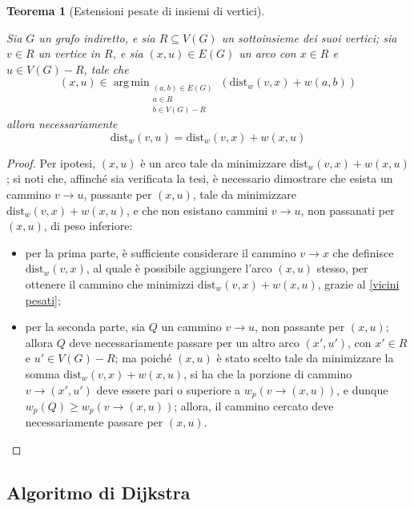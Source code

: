 \documentclass[14pt]{extreport}
\DeclareMathOperator*{\argmin}{arg\,min}
\newtheorem{theorem}{Teorema}[subsection]
\theoremstyle{definition}
\theoremstyle{definition}
\begin{document}
\begin{theorem}[Estensioni pesate di insiemi di vertici]
    \label{dijkstra theorem}

    Sia $G$ un grafo indiretto, e sia $R \subseteq V(G)$ un sottoinsieme dei suoi vertici; sia $v\in R$ un vertice in $R$, e sia $(x, u) \in E(G)$ un arco con $x \in R$ e $u \in V(G) - R$, tale che $$(x, u) \in \argmin_{\substack{(a, b) \in E(G) \\ a \in R \\ b \in V(G) - R}}{\left(\mathrm{dist}_w(v, x) + w(a, b)\right)}$$ allora necessariamente $$\mathrm{dist}_w(v, u) = \mathrm{dist}_w(v, x) + w(x, u)$$
\end{theorem}

\begin{proof}
    Per ipotesi, $(x, u)$ è un arco tale da minimizzare $\mathrm{dist}_w(v, x) + w(x, u)$; si noti che, affinché sia verificata la tesi, è necessario dimostrare che esista un cammino $v \rightarrow u$, passante per $(x, u)$, tale da minimizzare $\mathrm{dist}_w(v, x) + w(x, u)$, e che non esistano cammini $v \rightarrow u$, non passanati per $(x, u)$, di peso inferiore:

    \begin{itemize}
        \item per la prima parte, è sufficiente considerare il cammino $v \rightarrow x$ che definisce $\mathrm{dist}_w(v, x)$, al quale è possibile aggiungere l'arco $(x, u)$ stesso, per ottenere il cammino che minimizzi $\mathrm{dist}_w(v, x) + w(x, u)$, grazie al \cref{vicini pesati};
        \item per la seconda parte, sia $Q$ un cammino $v \rightarrow u$, non passante per $(x, u)$; allora $Q$ deve necessariamente passare per un altro arco $(x', u')$, con $x' \in R$ e $u' \in V(G) - R$; ma poiché $(x, u)$ è stato scelto tale da minimizzare la somma $\mathrm{dist}_w(v, x) + w(x, u)$, si ha che la porzione di cammino $v \rightarrow (x', u')$ deve essere pari o superiore a $w_p\left(v \rightarrow (x, u)\right)$, e dunque $w_p(Q) \ge w_p(v \rightarrow (x, u))$; allora, il cammino cercato deve necessariamente passare per $(x, u)$.
    \end{itemize}
\end{proof}

\subsection{Algoritmo di Dijkstra}
\end{document}
